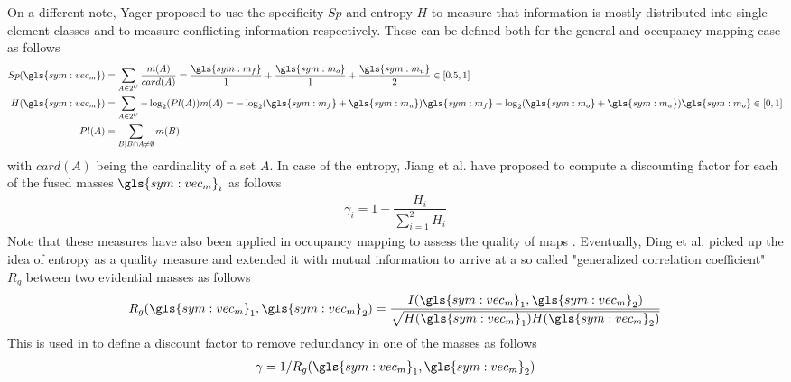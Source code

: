 %
On a different note, Yager \cite{yager2009fusion} proposed to use the specificity $Sp$ and entropy $H$ to measure that information is mostly distributed into single element classes and to measure conflicting information respectively. These can be defined both for the general and occupancy mapping case as follows
\begin{align}
	\label{eq:specificity}
	Sp(\gls{sym:vec_m}) &= \sum_{A \in 2^{U}}\dfrac{m(A)}{card(A)}=\dfrac{\gls{sym:m_f}}{1}+\dfrac{\gls{sym:m_o}}{1}+\dfrac{\gls{sym:m_u}}{2} \in [0.5,1]\\
	\label{eq:entropy}
	H(\gls{sym:vec_m}) &= \sum_{A \in 2^{U}} -\log_2(Pl(A))m(A) = -\log_2(\gls{sym:m_f} + \gls{sym:m_u})\gls{sym:m_f} - \log_2(\gls{sym:m_o} + \gls{sym:m_u})\gls{sym:m_o} \in [0,1]\\
	Pl(A) &= \sum_{B|B\cap A \neq \emptyset}m(B)
\end{align}
with $card(A)$ being the cardinality of a set $A$. In case of the entropy, Jiang et al. \cite{jiang2009combination} have proposed to compute a discounting factor for each of the fused masses $\gls{sym:vec_m}_i$ as follows
\begin{align}
	\gamma_i = 1-\dfrac{H_i}{\sum_{i=1}^{2}H_i}
\end{align}
Note that these measures have also been applied in occupancy mapping to assess the quality of maps \cite{yu2015evidential}.
%
Eventually, Ding et al. \cite{ding2002general} picked up the idea of entropy as a quality measure and extended it with mutual information to arrive at a so called "generalized correlation coefficient" $R_g$ between two evidential masses as follows
\begin{align}
	\label{eq:mutual_info_with_entrop}
	R_g(\gls{sym:vec_m}_1,\gls{sym:vec_m}_2) = \dfrac{I(\gls{sym:vec_m}_1,\gls{sym:vec_m}_2)}{\sqrt{H(\gls{sym:vec_m}_1)H(\gls{sym:vec_m}_2)}}
\end{align}
This is used in \cite{su2018research} to define a discount factor to remove redundancy in one of the masses as follows
\begin{align}
	\gamma = 1/R_g(\gls{sym:vec_m}_1,\gls{sym:vec_m}_2)
\end{align}
%
